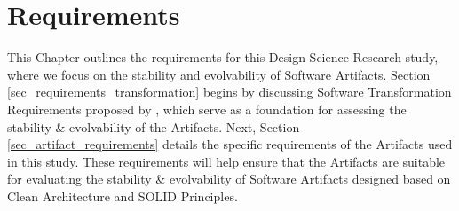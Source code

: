 \chapter{Requirements} \label{chap_requirements} 

This Chapter outlines the requirements for this Design Science Research study, where we
focus on the stability and evolvability of Software Artifacts. Section
\ref{sec_requirements_transformation} begins by discussing Software Transformation
Requirements proposed by \textcite{mannaert_normalized_2016}, which serve as a foundation
for assessing the stability \& evolvability of the Artifacts. Next, Section
\ref{sec_artifact_requirements} details the specific requirements of the Artifacts used in
this study. These requirements will help ensure that the Artifacts are suitable for
evaluating the stability \& evolvability of Software Artifacts designed based on Clean
Architecture and SOLID Principles.




